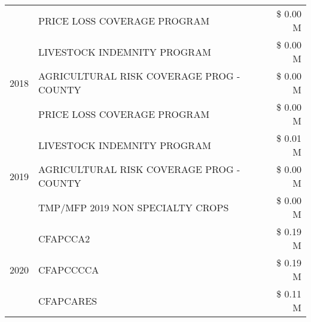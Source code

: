 \begin{tabular}{llr}
 & PRICE LOSS COVERAGE PROGRAM & \$ 0.00 M \\
\cline{1-3}
\multirow[t]{3}{*}{2018} & LIVESTOCK INDEMNITY PROGRAM & \$ 0.00 M \\
 & AGRICULTURAL RISK COVERAGE PROG - COUNTY & \$ 0.00 M \\
 & PRICE LOSS COVERAGE PROGRAM & \$ 0.00 M \\
\cline{1-3}
\multirow[t]{3}{*}{2019} & LIVESTOCK INDEMNITY PROGRAM & \$ 0.01 M \\
 & AGRICULTURAL RISK COVERAGE PROG - COUNTY & \$ 0.00 M \\
 & TMP/MFP 2019 NON SPECIALTY CROPS & \$ 0.00 M \\
\cline{1-3}
\multirow[t]{3}{*}{2020} & CFAPCCA2 & \$ 0.19 M \\
 & CFAPCCCCA & \$ 0.19 M \\
 & CFAPCARES & \$ 0.11 M \\
\cline{1-3}
\bottomrule
\end{tabular}
